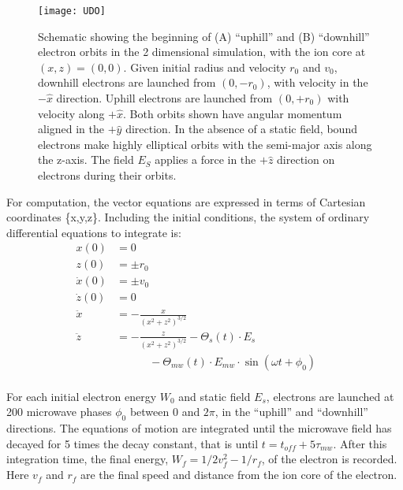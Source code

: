 \documentclass[aps,pra,reprint,groupedaddress]{revtex4-1}
\begin{document}
\begin{figure}
	\texttt{[image: UDO]}
	\caption{Schematic showing the beginning of (A) ``uphill'' and (B) ``downhill'' electron orbits in the 2 dimensional simulation, with the ion core at $(x, z) = (0, 0)$. Given initial radius and velocity $r_0$ and $v_0$, downhill electrons are launched from $(0, -r_0)$, with velocity in the $-\hat{x}$ direction. Uphill electrons are launched from $(0, +r_0)$ with velocity along $+\hat{x}$. Both orbits shown have angular momentum aligned in the $+\hat{y}$ direction. In the absence of a static field, bound electrons make highly elliptical orbits with the semi-major axis along the z-axis. The field $E_S$ applies a force in the $+\hat{z}$ direction on electrons during their orbits.}
	\label{fig:udo}
\end{figure}

For computation, the vector equations are expressed in terms of Cartesian coordinates \{x,y,z\}. Including the initial conditions, the system of ordinary differential equations to integrate is:
\begin{equation}
\begin{aligned}
x(0) & = 0 \\
z(0) & = \pm r_0 \\
\dot{x}(0) & = \pm v_0 \\
\dot{z}(0) & = 0 \\
\ddot{x} & = -\frac{x}{(x^2 + z^2)^{3/2}} \\
\ddot{z} & = -\frac{z}{(x^2 + z^2)^{3/2}} - \Theta_s(t) \cdot E_s \\
 & \quad \quad \quad - \Theta_{mw}(t) \cdot E_{mw} \cdot \sin{(\omega t + \phi_0)} & & \\
\end{aligned}
\end{equation}

For each initial electron energy $W_0$ and static field $E_s$, electrons are launched at 200 microwave phases $\phi_0$ between 0 and $2\pi$, in the ``uphill'' and ``downhill'' directions. The equations of motion are integrated until the microwave field has decayed for 5 times the decay constant, that is until  $t=t_{off} + 5\tau_{mw}$. After this integration time, the final energy, $W_f = 1/2 v_f^2 - 1/r_f$, of the electron is recorded. Here $v_f$ and $r_f$ are the final speed and distance from the ion core of the electron.
\end{document}
